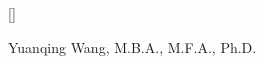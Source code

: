 



 
\usepackage[square, numbers]{natbib}
\usepackage{bibentry}
\renewcommand\refname{Publications}
\titleformat{\section}{\Large\scshape\raggedright}{}{0em}{}[\titlerule]





\usepackage{longtable}



\pagestyle{empty} %


\par{\centering
		{ \huge  Yuanqing Wang, }
        { \small M.B.A., M.F.A., Ph.D.}
 \bigskip\par}

